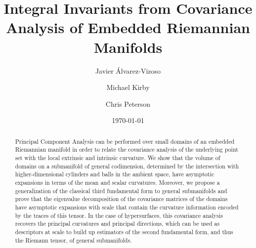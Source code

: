 \documentclass[letterpaper, reqno, 11pt]{amsart}
\theoremstyle{definition}
\theoremstyle{remark}
\numberwithin{equation}{section}
\begin{document}
\title{Integral Invariants from Covariance Analysis of Embedded Riemannian Manifolds}

\author[J. \'Alvarez-Vizoso]{Javier \'Alvarez-Vizoso}
\author[M. Kirby]{Michael Kirby}
\author[C. Peterson]{Chris Peterson}
\address{Department of Mathematics, Colorado State University, Fort Collins, CO, USA}

\date{\today}

\maketitle



\begin{abstract}
Principal Component Analysis can be performed over small domains of an embedded Riemannian manifold in order to relate the covariance analysis of the underlying point set with the local extrinsic and intrinsic curvature. We show that the volume of domains on a submanifold of general codimension, determined by the intersection with higher-dimensional cylinders and balls in the ambient space, have asymptotic expansions in terms of the mean and scalar curvatures. Moreover, we propose a generalization of the classical third fundamental form to general submanifolds and prove that the eigenvalue decomposition of the covariance matrices of the domains have asymptotic expansions with scale that contain the curvature information encoded by the traces of this tensor. In the case of hypersurfaces, this covariance analysis recovers the principal curvatures and principal directions, which can be used as descriptors at scale to build up estimators of the second fundamental form, and thus the Riemann tensor, of general submanifolds.
\end{abstract}


\DeclareRobustCommand{\SkipTocEntry}[5]{}

\makeatletter
\def\@tocline#1#2#3#4#5#6#7{\relax
\ifnum #1>\c@tocdepth %
  \else 
    \par \addpenalty\@secpenalty\addvspace{#2}%
\begingroup \hyphenpenalty\@M
    \@ifempty{#4}{%
      \@tempdima\csname r@tocindent\number#1\endcsname\relax
 }{%
   \@tempdima#4\relax
 }%
 \parindent\z@ \leftskip#3\relax \advance\leftskip\@tempdima\relax
 \rightskip\@pnumwidth plus4em \parfillskip-\@pnumwidth
 #5\leavevmode\hskip-\@tempdima #6\nobreak\relax
 \ifnum#1<0\hfill\else\dotfill\fi\hbox to\@pnumwidth{\@tocpagenum{#7}}\par
 \nobreak
 \endgroup
  \fi}
\makeatother
\end{document}
